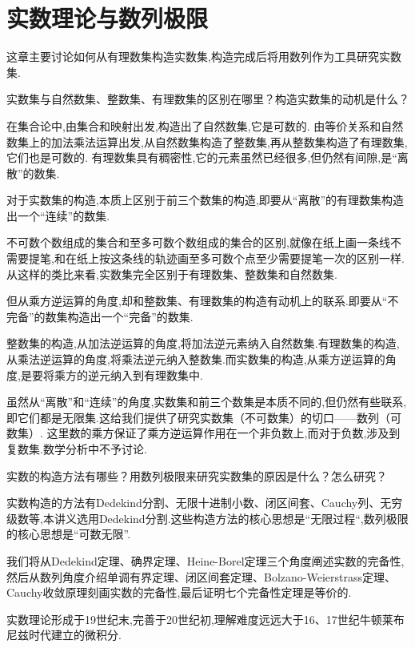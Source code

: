\chapter{实数理论与数列极限}

这章主要讨论如何从有理数集构造实数集,构造完成后将用数列作为工具研究实数集.

实数集与自然数集、整数集、有理数集的区别在哪里？构造实数集的动机是什么？

在集合论中,由集合和映射出发,构造出了自然数集,它是可数的.
由等价关系和自然数集上的加法乘法运算出发,从自然数集构造了整数集,再从整数集构造了有理数集,它们也是可数的.
有理数集具有稠密性,它的元素虽然已经很多,但仍然有间隙,是“离散”的数集.

对于实数集的构造,本质上区别于前三个数集的构造,即要从“离散”的有理数集构造出一个“连续”的数集.

不可数个数组成的集合和至多可数个数组成的集合的区别,就像在纸上画一条线不需要提笔,和在纸上按这条线的轨迹画至多可数个点至少需要提笔一次的区别一样.从这样的类比来看,实数集完全区别于有理数集、整数集和自然数集.

但从乘方逆运算的角度,却和整数集、有理数集的构造有动机上的联系.即要从“不完备”的数集构造出一个“完备”的数集.

整数集的构造,从加法逆运算的角度,将加法逆元素纳入自然数集.有理数集的构造,从乘法逆运算的角度,将乘法逆元纳入整数集.而实数集的构造,从乘方逆运算的角度,是要将乘方的逆元纳入到有理数集中.


\begin{note}
    虽然从“离散”和“连续”的角度,实数集和前三个数集是本质不同的,但仍然有些联系,即它们都是无限集.这给我们提供了研究实数集（不可数集）的切口——数列（可数集）.
    这里数的乘方保证了乘方逆运算作用在一个非负数上,而对于负数,涉及到复数集.数学分析中不予讨论.%
\end{note}

实数的构造方法有哪些？用数列极限来研究实数集的原因是什么？怎么研究？

    实数构造的方法有Dedekind分割、无限十进制小数、闭区间套、Cauchy列、无穷级数等,本讲义选用Dedekind分割.这些构造方法的核心思想是“无限过程“,数列极限的核心思想是“可数无限”.

    我们将从Dedekind定理、确界定理、Heine-Borel定理三个角度阐述实数的完备性,然后从数列角度介绍单调有界定理、闭区间套定理、Bolzano-Weierstrass定理、Cauchy收敛原理刻画实数的完备性,最后证明七个完备性定理是等价的.

\begin{note}
    实数理论形成于19世纪末,完善于20世纪初,理解难度远远大于16、17世纪牛顿莱布尼兹时代建立的微积分.
\end{note}



